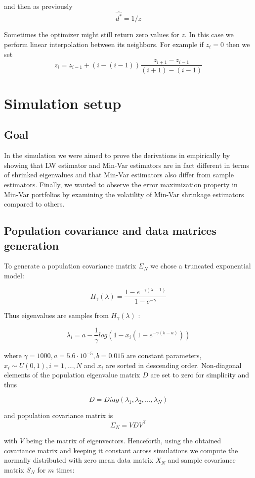 \documentclass{article}
\begin{document}
\noindent and then as previously $$ \hat{d^*} = 1/z $$

\noindent Sometimes the optimizer might still return zero values for $z$. In this case we perform linear interpolation between its neighbors. For example if $z_i = 0$ then we set 
$$ z_i = z_{i-1} +(i - (i-1))\dfrac{z_{i+1}-z_{i-1}}{(i+1)-(i-1)} $$

\section{Simulation setup}

\subsection{Goal}
In the simulation we were aimed to prove the derivations in  empirically by showing that LW estimator and Min-Var estimators are in fact different in terms of shrinked eigenvalues and that Min-Var estimators also differ from sample estimators. Finally, we wanted to observe the error maximization property in Min-Var portfolios by examining the volatility of Min-Var shrinkage estimators compared to others.

\subsection{Population covariance and data matrices generation}

To generate a population covariance matrix $\Sigma_N$ we chose a truncated exponential model:

$$
H_{\gamma}(\lambda) = \dfrac{1-e^{-\gamma(\lambda-1)}}{1-e^{-\gamma}}
$$

\noindent Thus eigenvalues are samples from $H_{\gamma}(\lambda)$ :

$$
\lambda_i = a - \dfrac{1}{\gamma}log(1-x_i(1-e^{-\gamma(b-a)}))
$$

\noindent where $\gamma = 1000,a=5.6 \cdot 10^{-5},b=0.015 $ are constant parameters, $x_i\sim U(0,1),i=1,...,N$ and $x_i$ are sorted in descending order. Non-diagonal elements of the population eigenvalue matrix $D$ are set to zero for simplicity and thus 

$$
D = Diag(\lambda_1,\lambda_2,...,\lambda_N) 
$$

\noindent and population covariance matrix is
$$
\Sigma_N = VDV^\intercal
$$

\noindent with $V$ being the matrix of eigenvectors. Henceforth, using the obtained covariance matrix and keeping it constant across simulations we compute the normally distributed with zero mean data matrix $X_N$ and sample covariance matrix $S_N$ for $m$ times:
\end{document}

